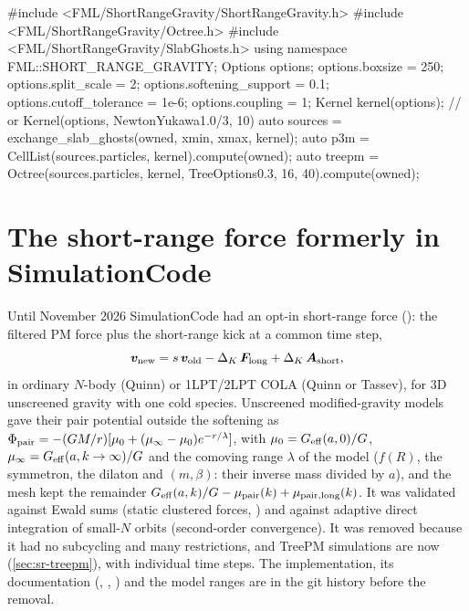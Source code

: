 \begin{cppcode}
#include <FML/ShortRangeGravity/ShortRangeGravity.h>
#include <FML/ShortRangeGravity/Octree.h>
#include <FML/ShortRangeGravity/SlabGhosts.h>
using namespace FML::SHORT_RANGE_GRAVITY;
Options options;
options.boxsize = 250; options.split_scale = 2; options.softening_support = 0.1;
options.cutoff_tolerance = 1e-6; options.coupling = 1;
Kernel kernel(options);                                  // or Kernel(options, NewtonYukawa{1.0/3, 10})
auto sources = exchange_slab_ghosts(owned, xmin, xmax, kernel);
auto p3m     = CellList(sources.particles, kernel).compute(owned);
auto treepm  = Octree(sources.particles, kernel, TreeOptions{0.3, 16, 40}).compute(owned);
\end{cppcode}

\section{The short-range force formerly in SimulationCode}\label{sec:sr-simcode}

Until November 2026 SimulationCode had an opt-in short-range force (): the filtered PM force
plus the short-range kick at a common time step,
\begin{equation}
\bm v_{\rm new}=s\,\bm v_{\rm old}-\Delta_K\,\bm F_{\rm long}+\Delta_K\,\bm A_{\rm short},
\end{equation}
in ordinary $N$-body (Quinn) or 1LPT/2LPT COLA (Quinn or Tassev), for 3D unscreened gravity with one cold species.
Unscreened modified-gravity models gave their pair potential outside the softening as
$\Phi_{\rm pair}=-(GM/r)[\mu_0+(\mu_\infty-\mu_0)e^{-r/\lambda}]$, with $\mu_0=G_{\rm eff}(a,0)/G$,
$\mu_\infty=G_{\rm eff}(a,k\to\infty)/G$ and the comoving range $\lambda$ of the model ($f(R)$, the symmetron,
the dilaton and $(m,\beta)$: their inverse mass divided by $a$), and the mesh kept the remainder
$G_{\rm eff}(a,k)/G-\mu_{\rm pair}(k)+\mu_{\rm pair,long}(k)$. It was validated against Ewald sums (static clustered
forces, ) and against adaptive direct integration of small-$N$ orbits
(second-order convergence). It was removed because it had no subcycling and many restrictions, and TreePM simulations
are now  (\cref{sec:sr-treepm}), with individual time steps. The implementation, its documentation
(, , ) and the model ranges are in the git history
before the removal.

